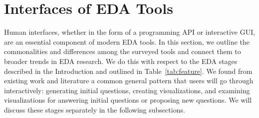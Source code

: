 \documentclass[11pt]{article}
\begin{document}
\section{Interfaces of EDA Tools}
\label{sec:feat}

Human interfaces, whether in the form of a programming API or interactive GUI, are an essential component of modern EDA tools. In this section, we outline the commonalities and differences among the surveyed tools and connect them to broader trends in EDA research. We do this with respect to the EDA stages described in the Introduction and outlined in Table~\ref{tab:feature}. We found from existing work and literature a common general pattern that users will go through interactively: generating initial questions, creating visualizations, and examining visualizations for answering initial questions or proposing new questions. We will discuss these stages separately in the following subsections. 
\end{document}
